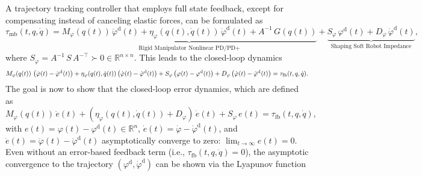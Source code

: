 A trajectory tracking controller that employs full state feedback, except for compensating instead of canceling elastic forces, can be formulated as~\citep{kelly1996class, della2020model}
\begin{equation}
    \tau_\mathrm{mb}(t,q,\dot{q}) = \underbrace{M_\varphi(q(t)) \, \ddot{\varphi}^\mathrm{d}(t) + \eta_\varphi(q(t),\dot{q}(t)) \, \dot{\varphi}^\mathrm{d}(t) + A^{-1} \, G(q(t))}_\text{Rigid Manipulator Nonlinear PD/PD+} + \underbrace{S_\varphi \, \varphi^\mathrm{d}(t) + D_\varphi \, \dot{\varphi}^\mathrm{d}(t)}_\text{Shaping Soft Robot Impedance},
\end{equation}
where $S_\varphi = A^{-1} \, S \, A^{-\top} \succ 0 \in \mathbb{R}^{n \times n}$.
This leads to the closed-loop dynamics
\begin{equation}\footnotesize
    M_\varphi(q(t)) \, \left ( \ddot{\varphi}(t) - \ddot{\varphi}^\mathrm{d}(t) \right ) + \eta_\varphi(q(t),\dot{q}(t)) \left ( \dot{\varphi}(t) - \dot{\varphi}^\mathrm{d}(t) \right ) + S_\varphi \left ( \varphi(t) - \varphi^\mathrm{d}(t) \right ) + D_\varphi \left ( \dot{\varphi}(t) - \dot{\varphi}^\mathrm{d}(t) \right ) = \tau_\mathrm{fb}(t,q,\dot{q}).
\end{equation}
The goal is now to show that the closed-loop error dynamics, which are defined as
\begin{equation}
    M_\varphi(q(t)) \, \ddot{e}(t) + \left ( \eta_\varphi(q(t),\dot{q}(t)) + D_\varphi \right ) \, \dot{e}(t) + S_\varphi \, e(t) = \tau_\mathrm{fb}(t,q,\dot{q}),
\end{equation}
with $e(t) = \varphi(t) - \varphi^\mathrm{d}(t) \in \mathbb{R}^n$, $\dot{e}(t) = \dot{\varphi} - \dot{\varphi}^\mathrm{d}(t)$, and $\ddot{e}(t) = \ddot{\varphi}(t) - \ddot{\varphi}^\mathrm{d}(t)$ asymptotically converge to zero: $\lim_{t \to \infty} e(t) = 0$.
Even without an error-based feedback term (i.e., $\tau_\mathrm{fb}(t,q,\dot{q}) = 0$), the asymptotic convergence to the trajectory $(\varphi^\mathrm{d}, \dot{\varphi}^\mathrm{d})$ can be shown via the Lyapunov function
